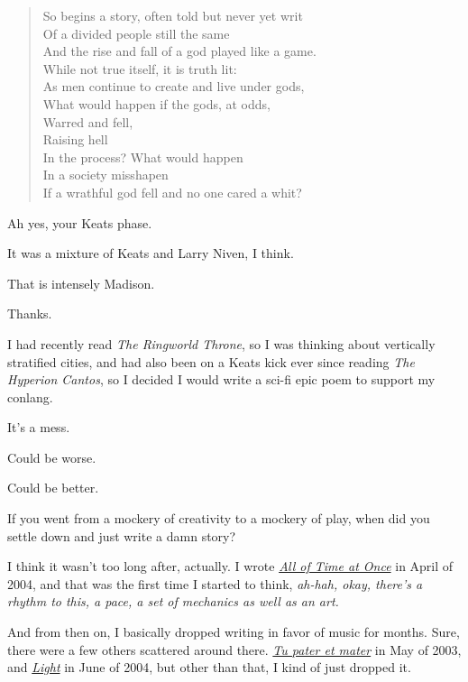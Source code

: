 \begin{paracol}{2}
\begin{leftcolumn}
\begin{verse}
So begins a story, often told but never yet writ\\
\vin Of a divided people still the same\\
\vin And the rise and fall of a god played like a game.\\
While not true itself, it is truth lit:\\
\vin As men continue to create and live under gods,\\
\vin What would happen if the gods, at odds,\\
\vin \vin Warred and fell,\\
\vin \vin Raising hell\\
\vin In the process? What would happen\\
\vin In a society misshapen\\
If a wrathful god fell and no one cared a whit?
\end{verse}

\begin{ally}
Ah yes, your Keats phase.
\end{ally}
It was a mixture of Keats and Larry Niven, I think.

\begin{ally}
That is intensely Madison.
\end{ally}
Thanks.

I had recently read \emph{The Ringworld Throne}, so I was thinking about vertically stratified cities, and had also been on a Keats kick ever since reading \emph{The Hyperion Cantos}, so I decided I would write a sci-fi epic poem to support my conlang.

It's a mess.

\begin{ally}
Could be worse.
\end{ally}
Could be better.
\newpage

\begin{ally}
If you went from a mockery of creativity to a mockery of play, when did you settle down and just write a damn story?
\end{ally}
I think it wasn't too long after, actually. I wrote \href{https://writing.drab-makyo.com/fiction/all-of-time-at-once/}{\emph{All of Time at Once}} in April of 2004, and that was the first time I started to think, \emph{ah-hah, okay, there's a rhythm to this, a pace, a set of mechanics as well as an art.}

And from then on, I basically dropped writing in favor of music for months. Sure, there were a few others scattered around there. \href{https://writing.drab-makyo.com/fiction/tu-pater-et-mater/}{\emph{Tu pater et mater}} in May of 2003, and \href{https://writing.drab-makyo.com/fiction/light/}{\emph{Light}} in June of 2004, but other than that, I kind of just dropped it.


\end{leftcolumn}
\end{paracol}
